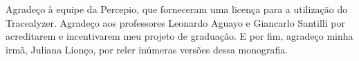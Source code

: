 \begin{comment}


\end{comment}

\begin{agradecimentos}

Agradeço à equipe da Percepio, que forneceram uma licença para a utilização do Tracealyzer. Agradeço aos professores Leonardo Aguayo e Giancarlo Santilli por acreditarem e incentivarem meu projeto de graduação. E por fim, agradeço minha irmã, Juliana Lionço, por reler inúmeras versões dessa monografia.
	
\end{agradecimentos}

